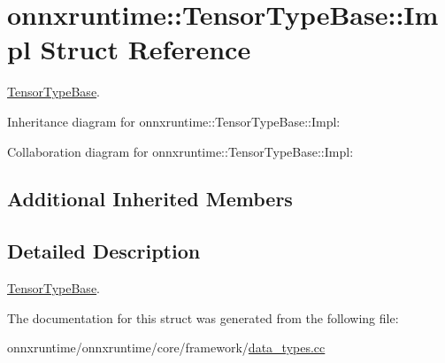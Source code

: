 \hypertarget{structonnxruntime_1_1TensorTypeBase_1_1Impl}{}\section{onnxruntime\+:\+:Tensor\+Type\+Base\+:\+:Impl Struct Reference}
\label{structonnxruntime_1_1TensorTypeBase_1_1Impl}


\mbox{\hyperlink{classonnxruntime_1_1TensorTypeBase}{Tensor\+Type\+Base}}.  




Inheritance diagram for onnxruntime\+:\+:Tensor\+Type\+Base\+:\+:Impl\+:


Collaboration diagram for onnxruntime\+:\+:Tensor\+Type\+Base\+:\+:Impl\+:
\subsection*{Additional Inherited Members}


\subsection{Detailed Description}
\mbox{\hyperlink{classonnxruntime_1_1TensorTypeBase}{Tensor\+Type\+Base}}. 

The documentation for this struct was generated from the following file\+:\begin{DoxyCompactItemize}
\item 
onnxruntime/onnxruntime/core/framework/\mbox{\hyperlink{data__types_8cc}{data\+\_\+types.\+cc}}\end{DoxyCompactItemize}

